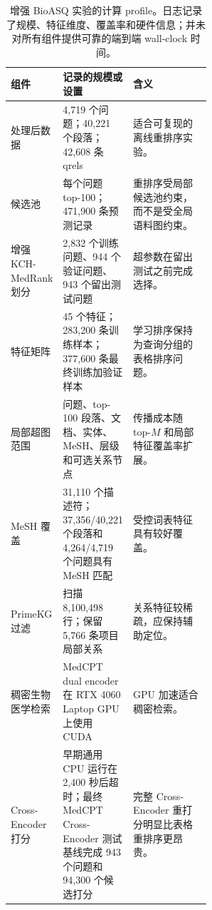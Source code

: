 \begin{table}[t]
\centering
\small
\caption{增强 BioASQ 实验的计算 profile。日志记录了规模、特征维度、覆盖率和硬件信息；并未对所有组件提供可靠的端到端 wall-clock 时间。}
\label{tab:efficiency-analysis}
\begin{tabularx}{\linewidth}{p{0.22\linewidth}p{0.34\linewidth}X}
\toprule
组件 & 记录的规模或设置 & 含义 \\
\midrule
处理后数据 & 4,719 个问题；40,221 个段落；42,608 条 qrels & 适合可复现的离线重排序实验。 \\
候选池 & 每个问题 top-100；471,900 条预测记录 & 重排序受局部候选池约束，而不是受全局语料图约束。 \\
增强 KCH-MedRank 划分 & 2,832 个训练问题、944 个验证问题、943 个留出测试问题 & 超参数在留出测试之前完成选择。 \\
特征矩阵 & 45 个特征；283,200 条训练样本；377,600 条最终训练加验证样本 & 学习排序保持为查询分组的表格排序问题。 \\
局部超图范围 & 问题、top-100 段落、文档、实体、MeSH、层级和可选关系节点 & 传播成本随 top-$M$ 和局部特征覆盖率扩展。 \\
MeSH 覆盖 & 31,110 个描述符；37,356/40,221 个段落和 4,264/4,719 个问题具有 MeSH 匹配 & 受控词表特征具有较好覆盖。 \\
PrimeKG 过滤 & 扫描 8,100,498 行；保留 5,766 条项目局部关系 & 关系特征较稀疏，应保持辅助定位。 \\
稠密生物医学检索 & MedCPT dual encoder 在 RTX 4060 Laptop GPU 上使用 CUDA & GPU 加速适合稠密检索。 \\
Cross-Encoder 打分 & 早期通用 CPU 运行在 2,400 秒后超时；最终 MedCPT Cross-Encoder 测试基线完成 943 个问题和 94,300 个候选打分 & 完整 Cross-Encoder 重打分明显比表格重排序更昂贵。 \\
\bottomrule
\end{tabularx}
\end{table}
